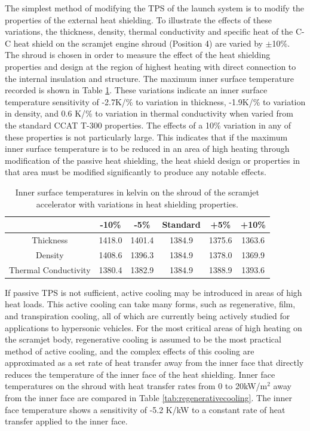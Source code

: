 The simplest method of modifying the TPS of the launch system is to modify the properties of the external heat shielding. 
To illustrate the effects of these variations, the thickness, density, thermal conductivity and specific heat of the C-C heat shield on the scramjet engine shroud (Position \textcolor{black}{4}) are varied by $\pm$10\%. The shroud is chosen in order to measure the effect of the heat shielding properties and design at the region of highest heating with direct connection to the internal insulation and structure. The maximum inner surface temperature recorded is shown in Table \ref{tab:tpsscramjet}. These variations indicate an inner surface temperature sensitivity of -2.7K/\% to variation in thickness, -1.9K/\% to variation in density, and 0.6 K/\% to variation in thermal conductivity when varied from the standard CCAT T-300 properties. 
The effects of a 10\% variation in any of these properties is not particularly large. This indicates that if the maximum inner surface temperature is to be reduced in an area of high heating through modification of the passive heat shielding, the heat shield design or properties in that area must be modified significantly to produce any notable effects. 
\begin{table}[ht]
	\centering
	\begin{tabular}{|c|c|c|c|c|c|}
		\hline  & -10\% & -5\% & Standard & +5\% & +10\% \\ 
		\hline Thickness & 1418.0 & 1401.4 & 1384.9  &   1375.6&   1363.6\\ 
		\hline Density & 1408.6 &  1396.3  & 1384.9 &  1378.0&  1369.9\\ 
		\hline Thermal Conductivity &  1380.4 & 1382.9 & 1384.9 &  1388.9& 1393.6\\ 
		\hline 
	\end{tabular}
	
	\caption{Inner surface temperatures in kelvin on the shroud of the scramjet accelerator with variations in heat shielding properties.}
	\label{tab:tpsscramjet}
\end{table}
If passive TPS is not sufficient, active cooling may be introduced in areas of high heat loads. This active cooling can take many forms, such as regenerative, film, and transpiration cooling\cite{Zhu2018}, all of which are currently being actively studied for applications to hypersonic vehicles. For the most critical areas of high heating on the scramjet body, regenerative cooling is assumed to be the most practical method of active cooling, and the complex effects of this cooling are approximated as a set rate of heat transfer away from the inner face that directly reduces the temperature of the inner face of the heat shielding. Inner face temperatures on the shroud with heat transfer rates from 0 to 20kW/m$^2$ away from the inner face are compared in Table \ref{tab:regenerativecooling}. The inner face temperature shows a sensitivity of -5.2 K/kW to a constant rate of heat transfer applied to the inner face. 
